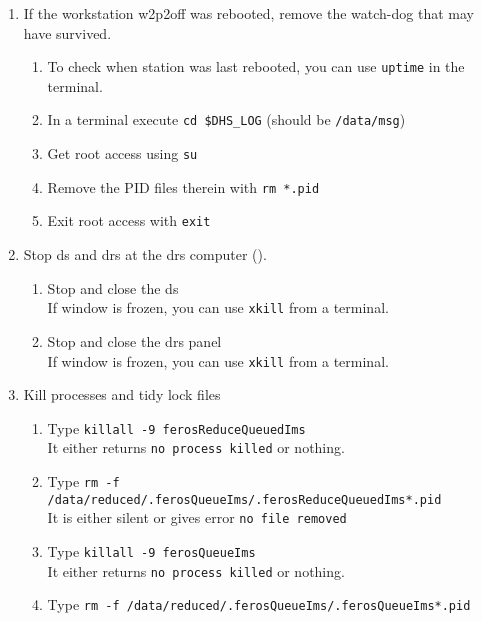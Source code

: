 \documentclass[11pt,fleqn,a4paper]{book}
\begin{document}
\label{proc:FEROSDRSrestart}
  \begin{enumerate} 
    \item If the workstation \gls{w2p2off} was rebooted, remove the watch-dog that may have survived.
    \begin{enumerate}
        \item To check when station was last rebooted, you can use \texttt{uptime} in the terminal.
        \item In a terminal execute \texttt{cd \$DHS\_LOG} (should be \texttt{/data/msg})
        \item Get root access using \texttt{su}
        \item Remove the PID files therein with \texttt{rm *.pid}
        \item Exit root access with \texttt{exit}
    \end{enumerate}
    \item \label{list:stopDRS}Stop \gls{ds} and \gls{drs} at the \gls{drs} computer ().
      \begin{enumerate}
          \item Stop and close the \gls{ds}\\
                If window is frozen, you can use \texttt{xkill} from a terminal.\\
          \item Stop and close the \gls{drs} panel\\
                If window is frozen, you can use \texttt{xkill} from a terminal.
      \end{enumerate}
    \item \label{list:killDRS}Kill processes and tidy lock files
    \begin{enumerate}
    \item Type \texttt{killall -9 ferosReduceQueuedIms}\\
          It either returns \texttt{no process killed} or nothing.  
    \item Type \texttt{rm -f /data/reduced/.ferosQueueIms/.ferosReduceQueuedIms*.pid}\\
          It is either silent or gives error \texttt{no file removed}
    \item Type \texttt{killall -9 ferosQueueIms}\\
          It either returns \texttt{no process killed} or nothing.  
    \item Type \texttt{rm -f /data/reduced/.ferosQueueIms/.ferosQueueIms*.pid}\\

\end{enumerate}
\end{enumerate}
\end{document}
